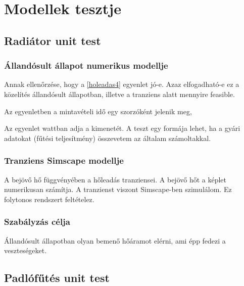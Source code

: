 \section{Modellek tesztje}

\subsection{Radiátor unit test}

\subsubsection{Állandósult állapot numerikus modellje}

Annak ellenőrzése, hogy a \ref{holeadas4} egyenlet jó-e. Azaz elfogadható-e ez a közelítés állandósult állapotban, illetve a tranziens alatt mennyire feasible. 

Az egyenletben a mintavételi idő egy szorzóként jelenik meg, 

Az egyenlet wattban adja a kimenetét.
A teszt egy formája lehet, ha a gyári adatokat (fűtési teljesítmény) összevetem az általam számoltakkal.

\subsubsection{Tranziens Simscape modellje}
A bejövő hő függvényében a hőleadás tranziensei. A bejövő hőt a képlet numerikusan számítja. A tranzienst viszont Simscape-ben szimulálom. Ez folytonos rendszert feltételez.

\subsubsection{Szabályzás célja}

Állandósult állapotban olyan bemenő hőáramot elérni, ami épp fedezi a veszteségeket.

\subsection{Padlófűtés unit test}
